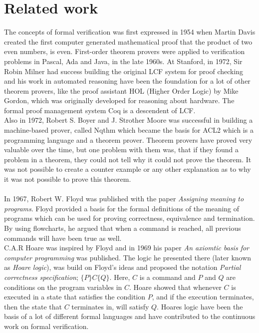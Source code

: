\documentclass[a4paper]{report}
\begin{document}
\chapter{Related work}
The concepts of formal verification was first expressed in 1954 when Martin Davis created the first computer generated mathematical proof that the product of two even numbers, is even. First-order theorem provers were applied to verification problems in Pascal, Ada and Java, in the late 1960s.
At Stanford, in 1972, Sir Robin Milner had success building the original LCF system for proof checking and his work in automated reasoning have been the foundation for a lot of other theorem provers, like the proof assistant HOL (Higher Order Logic) by Mike Gordon, which was originally developed for reasoning about hardware. The formal proof management system Coq is a descendent of LCF. \\
Also in 1972, Robert S. Boyer and J. Strother Moore was successful in building a machine-based prover, called Nqthm which became the basis for ACL2 which is a programming language and a theorem prover. Theorem provers have proved very valuable over the time, but one problem with them was, that if they found a problem in a theorem, they could not tell why it could not prove the theorem. It was not possible to create a counter example or any other explanation as to why it was not possible to prove this theorem. \\\\
In 1967, Robert W. Floyd was published with the paper \textit{Assigning meaning to programs}\cite{Floyd1967}. Floyd provided a basis for the formal definitions of the meaning of programs which can be used for proving correctness, equivalence and termination. By using flowcharts, he argued that when a command is reached, all previous commands will have been true as well.\\ C.A.R Hoare was inspired by Floyd and in 1969 his paper \textit{An axiomtic basis for computer programming}\cite{Hoare1969} was published. The logic he presented there (later known as \textit{Hoare logic}), was build on Floyd's ideas and proposed the notation \textit{Partial correctness specification}; $\{P\} C \{Q\}$. Here, $C$ is a command and $P$ and $Q$ are conditions on the program variables in $C$. Hoare showed that whenever $C$ is executed in a state that satisfies the condition $P$, and if the execution terminates, then the state that $C$ terminates in, will satisfy $Q$. Hoares logic have been the basis of a lot of different formal languages and have contributed to the continuous work on formal verification. \\
\end{document}

